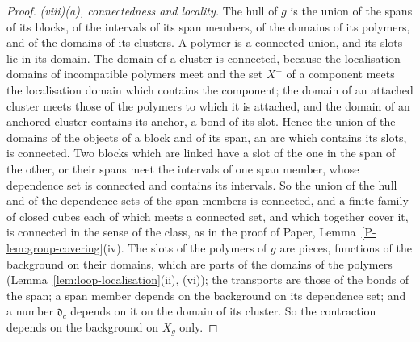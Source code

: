 \documentclass[11pt]{preprint}
\numberwithin{equation}{section}
\theoremstyle{definition}
\theoremstyle{remark}
\theoremstyle{plain}
\begin{document}
\begin{proof}
\emph{(viii)(a), connectedness and locality.} The hull of $g$ is the union of the spans of its blocks, of the intervals of its span members, of the domains of its polymers, and of the domains of its clusters. A polymer is a connected union, and its slots lie in its domain. The domain of a cluster is connected, because the localisation domains of incompatible polymers meet and the set $X^+$ of a component meets the localisation domain which contains the component; the domain of an attached cluster meets those of the polymers to which it is attached, and the domain of an anchored cluster contains its anchor, a bond of its slot. Hence the union of the domains of the objects of a block and of its span, an arc which contains its slots, is connected. Two blocks which are linked have a slot of the one in the span of the other, or their spans meet the intervals of one span member, whose dependence set is connected and contains its intervals. So the union of the hull and of the dependence sets of the span members is connected, and a finite family of closed cubes each of which meets a connected set, and which together cover it, is connected in the sense of the class, as in the proof of Paper, Lemma~\ref{P-lem:group-covering}(iv). The slots of the polymers of $g$ are pieces, functions of the background on their domains, which are parts of the domains of the polymers (Lemma~\ref{lem:loop-localisation}(ii), (vi)); the transports are those of the bonds of the span; a span member depends on the background on its dependence set; and a number $\mathfrak d_c$ depends on it on the domain of its cluster. So the contraction depends on the background on $X_g$ only.


\end{proof}
\end{document}
